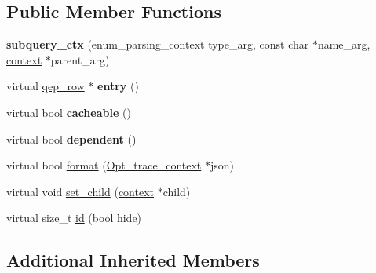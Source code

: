 \subsection*{Public Member Functions}
\begin{DoxyCompactItemize}
\item 
\mbox{\label{classopt__explain__json__namespace_1_1subquery__ctx_ac6c4a646fbe15ee031e058535b1c7ce6}} 
{\bfseries subquery\+\_\+ctx} (enum\+\_\+parsing\+\_\+context type\+\_\+arg, const char $\ast$name\+\_\+arg, \mbox{\hyperlink{classopt__explain__json__namespace_1_1context}{context}} $\ast$parent\+\_\+arg)
\item 
\mbox{\label{classopt__explain__json__namespace_1_1subquery__ctx_a8b243a0c9cb7ea61db723377cc6f211e}} 
virtual \mbox{\hyperlink{classqep__row}{qep\+\_\+row}} $\ast$ {\bfseries entry} ()
\item 
\mbox{\label{classopt__explain__json__namespace_1_1subquery__ctx_a10a31708578590f205ebbc52c4343055}} 
virtual bool {\bfseries cacheable} ()
\item 
\mbox{\label{classopt__explain__json__namespace_1_1subquery__ctx_a954add25aaeb349f84743515936850d4}} 
virtual bool {\bfseries dependent} ()
\item 
virtual bool \mbox{\hyperlink{classopt__explain__json__namespace_1_1subquery__ctx_ab09c364c9a8a64f548140c8035309dc6}{format}} (\mbox{\hyperlink{classOpt__trace__context}{Opt\+\_\+trace\+\_\+context}} $\ast$json)
\item 
virtual void \mbox{\hyperlink{classopt__explain__json__namespace_1_1subquery__ctx_aa096e69d58d2c6a241e66619bd23f891}{set\+\_\+child}} (\mbox{\hyperlink{classopt__explain__json__namespace_1_1context}{context}} $\ast$child)
\item 
virtual size\+\_\+t \mbox{\hyperlink{classopt__explain__json__namespace_1_1subquery__ctx_abfd5e54f4399b5b4269573895c84a0dc}{id}} (bool hide)
\end{DoxyCompactItemize}
\subsection*{Additional Inherited Members}


